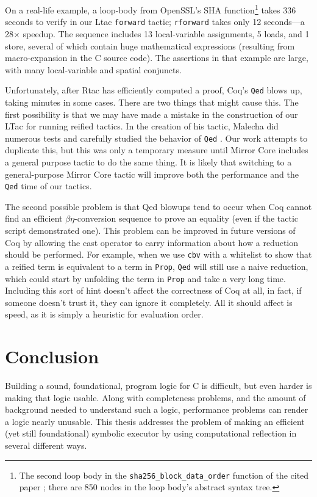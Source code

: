 \documentclass{puthesis}
\begin{document}
On a real-life example, a loop-body from OpenSSL's SHA
function\footnote{The second loop body in the
  \lstinline{sha256_block_data_order} function of the cited paper
  \cite{appel15:sha}; there are 850 nodes in the loop body's abstract
  syntax tree.}  takes 336 seconds to verify in our Ltac
\lstinline{forward} tactic; \lstinline|rforward| takes only 12
seconds---a 28$\times$ speedup. The sequence includes 13
local-variable assignments, 5 loads, and 1 store, several of which
contain huge mathematical expressions (resulting from macro-expansion
in the C source code). The assertions in that example are large, with
many local-variable and spatial conjuncts.

Unfortunately, after Rtac has efficiently computed a proof, Coq's
\lstinline|Qed| blows up, taking minutes in some cases.  There are two
things that might cause this. The first possibility is that we may
have made a mistake in the construction of our LTac for running
reified tactics. In the creation of his tactic, Malecha did numerous
tests and carefully studied the behavior of \lstinline|Qed|
\cite[section~4.3]{malecha:thesis}. Our work attempts to duplicate
this, but this was only a temporary measure until Mirror Core includes
a general purpose tactic to do the same thing. It is likely that
switching to a general-purpose Mirror Core tactic will improve both
the performance and the \lstinline|Qed| time of our tactics.

The second possible problem is that Qed blowups
tend to occur when Coq cannot find an efficient $\beta\eta$-conversion
sequence to prove an equality (even if the tactic script demonstrated
one). This problem can be improved in future versions of Coq by
allowing the cast operator to carry information about how a reduction
should be performed. For example, when we use \lstinline|cbv| with a
whitelist to show that a reified term is equivalent to a term in
\lstinline|Prop|, \lstinline|Qed| will still use a naive reduction,
which could start by unfolding the term in \lstinline|Prop| and take a
very long time. Including this sort of hint doesn't affect the
correctness of Coq at all, in fact, if someone doesn't trust it, they
can ignore it completely. All it should affect is speed, as it is
simply a heuristic for evaluation order.

\chapter{Conclusion}

Building a sound, foundational, program logic for C is difficult, but
even harder is making that logic usable. Along with completeness
problems, and the amount of background needed to understand such a
logic, performance problems can render a logic nearly unusable. This
thesis addresses the problem of making an efficient (yet still
foundational) symbolic executor by using computational reflection in
several different ways.
\end{document}
